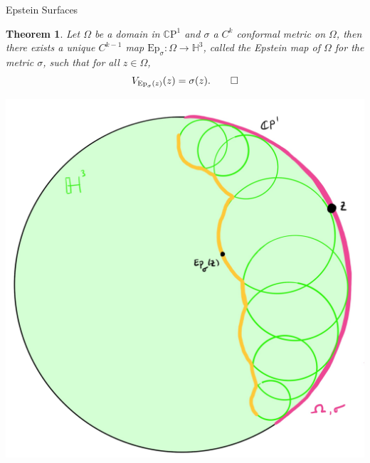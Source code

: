 \documentclass[professionalfont]{beamer}
\newcommand{\CP}{\mathbb{C}\mathrm{P}}
\renewcommand{\H}{\mathbb{H}}
\newtheorem{thm}{Theorem}[section]
\begin{document}
\begin{frame}{Epstein Surfaces}


\begin{thm}
Let $\Omega$ be a domain in $\CP^1$  and $\sigma$ a $C^k$ conformal metric on $\Omega$, then there exists a unique $C^{k-1}$ map $\mathrm{Ep}_\sigma : \Omega \to \H^3$, called the Epstein map of $\Omega$ for the metric $\sigma$, such that for all $z \in \Omega$,
\[
V_{\mathrm{Ep}_\sigma(z)}(z) = \sigma(z). \qed
\]
\end{thm}


\centering\includegraphics[scale=0.07]{Epstein-4.jpg}

\end{frame}


\end{document}
